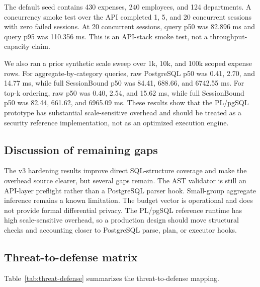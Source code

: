 \documentclass[journal]{IEEEtran}
\begin{document}
The default seed contains 430 expenses, 240 employees, and 124
departments. A concurrency smoke test over the API completed 1, 5, and
20 concurrent sessions with zero failed sessions. At 20 concurrent
sessions, query p50 was 82.896 ms and query p95 was 110.356 ms. This is
an API-stack smoke test, not a throughput-capacity claim.

We also ran a prior synthetic scale sweep over 1k, 10k, and 100k scoped
expense rows. For aggregate-by-category queries, raw PostgreSQL p50 was
0.41, 2.70, and 14.77 ms, while full SessionBound p50 was 84.41, 688.66,
and 6742.55 ms. For top-k ordering, raw p50 was 0.40, 2.54, and 15.62 ms,
while full SessionBound p50 was 82.44, 661.62, and 6965.09 ms. These
results show that the PL/pgSQL prototype has substantial scale-sensitive
overhead and should be treated as a security reference implementation,
not as an optimized execution engine.

\hypertarget{remaining-gaps}{%
\subsection{Discussion of remaining gaps}\label{remaining-gaps}}

The v3 hardening results improve direct SQL-structure coverage and make
the overhead source clearer, but several gaps remain. The AST validator
is still an API-layer preflight rather than a PostgreSQL parser hook.
Small-group aggregate inference remains a known limitation. The budget
vector is operational and does not provide formal differential privacy.
The PL/pgSQL reference runtime has high scale-sensitive overhead, so a
production design should move structural checks and accounting closer to
PostgreSQL parse, plan, or executor hooks.

\hypertarget{threat-to-defense-matrix}{%
\subsection{Threat-to-defense
matrix}\label{threat-to-defense-matrix}}

Table~\ref{tab:threat-defense} summarizes the threat-to-defense
mapping.
\end{document}
